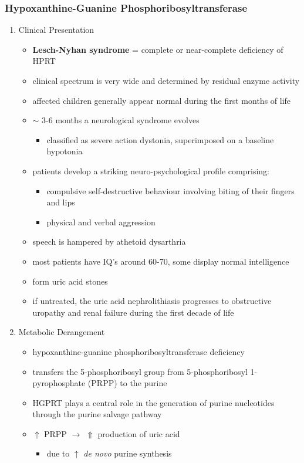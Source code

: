 \documentclass{scrartcl}
\begin{document}
\subsubsection{Hypoxanthine-Guanine Phosphoribosyltransferase}
\label{sec:org890c095}
\begin{enumerate}
\item Clinical Presentation
\label{sec:org6812e78}
\begin{itemize}
\item \textbf{Lesch-Nyhan syndrome} = complete or near-complete deficiency of HPRT
\item clinical spectrum is very wide and determined by residual enzyme activity
\item affected children generally appear normal during the first months of
life
\item \(\sim\) 3-6 months a neurological syndrome evolves
\begin{itemize}
\item classified as severe action dystonia, superimposed on a baseline hypotonia
\end{itemize}
\item patients develop a striking neuro-psychological profile comprising:
\begin{itemize}
\item compulsive self-destructive behaviour involving biting of their
fingers and lips
\item physical and verbal aggression
\end{itemize}
\item speech is hampered by athetoid dysarthria
\item most patients have IQ’s around 60-70, some display normal intelligence
\item form uric acid stones
\item if untreated, the uric acid nephrolithiasis progresses to
obstructive uropathy and renal failure during the first decade of
life
\end{itemize}

\item Metabolic Derangement
\label{sec:org251decb}
\begin{itemize}
\item hypoxanthine-guanine phosphoribosyltransferase deficiency
\end{itemize}
\begin{itemize}
\item transfers the 5-phosphoribosyl group from 5-phosphoribosyl
1-pyrophosphate (PRPP) to the purine
\item HGPRT plays a central role in the generation of purine nucleotides
through the purine salvage pathway
\item \(\uparrow\) PRPP \(\to\) \(\Uparrow\) production of uric acid
\begin{itemize}
\item due to \(\uparrow\) \emph{de novo} purine synthesis
\end{itemize}
\end{itemize}


\end{enumerate}
\end{document}
